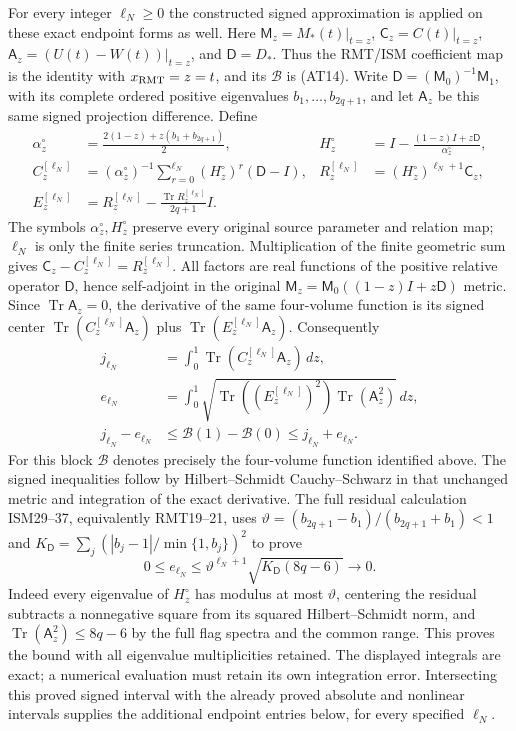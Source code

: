 For every integer $\ell_N\ge0$ the constructed signed approximation
is applied on these exact endpoint forms as well. Here $\mathsf M_z=M_*(t)|_{t=z}$,
$\mathsf C_z=C(t)|_{t=z}$, $\mathsf A_z=(U(t)-W(t))|_{t=z}$,
and $\mathsf D=D_*$. Thus the RMT/ISM coefficient map is the
identity with $x_{\rm RMT}=z=t$, and its $\mathcal B$ is (AT14).
Write $\mathsf D=(\mathsf M_0)^{-1}\mathsf M_1$, with its complete
ordered positive eigenvalues $b_1,\ldots,b_{2q+1}$, and let
$\mathsf A_z$ be this same signed projection difference. Define
\[
 \begin{aligned}
 \alpha_z^\circ&=\frac{2(1-z)+z(b_1+b_{2q+1})}{2},&
 H_z^\circ&=I-\frac{(1-z)I+z\mathsf D}{\alpha_z^\circ},\\
 C_z^{[\ell_N]}&=(\alpha_z^\circ)^{-1}
       \sum_{r=0}^{\ell_N}(H_z^\circ)^r(\mathsf D-I),&
 R_z^{[\ell_N]}&=(H_z^\circ)^{\ell_N+1}\mathsf C_z,\\
 E_z^{[\ell_N]}&=R_z^{[\ell_N]}
          -\frac{\operatorname{Tr}R_z^{[\ell_N]}}{2q+1}I .
 \end{aligned}
 \tag{AT19ba}
\]
The symbols $\alpha_z^\circ,H_z^\circ$ preserve every original
source parameter and relation map; $\ell_N$ is only the finite
series truncation. Multiplication of the finite geometric sum
gives $\mathsf C_z-C_z^{[\ell_N]}=R_z^{[\ell_N]}$.
All factors are real functions of the positive relative
operator $\mathsf D$, hence self-adjoint in the original
$\mathsf M_z=\mathsf M_0((1-z)I+z\mathsf D)$ metric.
Since $\operatorname{Tr}\mathsf A_z=0$, the derivative of the same
four-volume function is its signed center
$\operatorname{Tr}(C_z^{[\ell_N]}\mathsf A_z)$ plus
$\operatorname{Tr}(E_z^{[\ell_N]}\mathsf A_z)$.
Consequently
\[
 \begin{aligned}
 j_{\ell_N}&=\int_0^1
       \operatorname{Tr}(C_z^{[\ell_N]}\mathsf A_z)\,dz,\\
 e_{\ell_N}&=\int_0^1
       \sqrt{\operatorname{Tr}((E_z^{[\ell_N]})^2)
                     \operatorname{Tr}(\mathsf A_z^2)}\,dz,\\
 j_{\ell_N}-e_{\ell_N}
 &\le\mathcal B(1)-\mathcal B(0)\le j_{\ell_N}+e_{\ell_N}.
 \end{aligned}
 \tag{AT19bb}
\]
For this block $\mathcal B$ denotes precisely the four-volume
function identified above. The signed inequalities follow by
Hilbert--Schmidt Cauchy--Schwarz in that unchanged metric and
integration of the exact derivative.
The full residual calculation ISM29--37, equivalently RMT19--21,
uses
$\vartheta=(b_{2q+1}-b_1)/(b_{2q+1}+b_1)<1$ and
$K_{\mathsf D}=\sum_j(|b_j-1|/\min\{1,b_j\})^2$ to prove
\[
 0\le e_{\ell_N}\le
    \vartheta^{\ell_N+1}\sqrt{K_{\mathsf D}(8q-6)}
       \longrightarrow0.
 \tag{AT19bc}
\]
Indeed every eigenvalue of $H_z^\circ$ has modulus at most
$\vartheta$, centering the residual subtracts a nonnegative square
from its squared Hilbert--Schmidt norm, and
$\operatorname{Tr}(\mathsf A_z^2)\le8q-6$ by the full flag spectra
and the common range. This proves the bound with all eigenvalue
multiplicities retained. The displayed integrals are exact; a
numerical evaluation must retain its own integration error.
Intersecting this proved signed interval with the already proved
absolute and nonlinear intervals supplies the additional endpoint
entries below, for every specified $\ell_N$.

